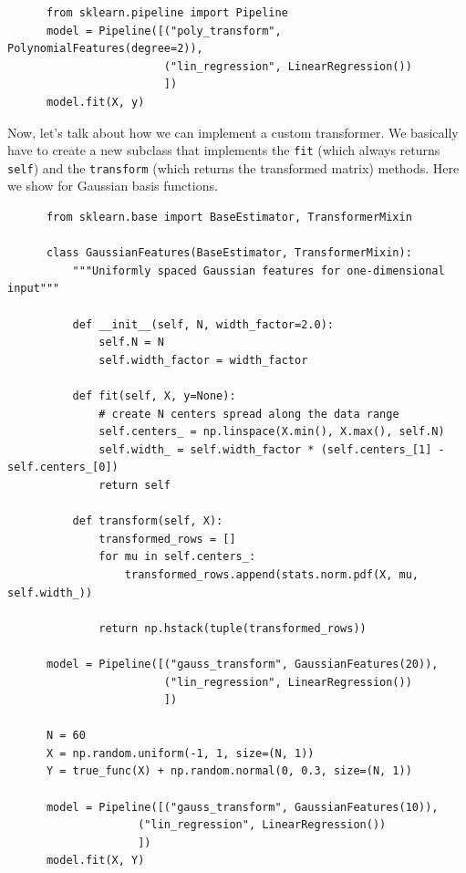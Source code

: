 \documentclass{article}
\begin{document}
      \begin{lstlisting}
      from sklearn.pipeline import Pipeline
      model = Pipeline([("poly_transform", PolynomialFeatures(degree=2)), 
                        ("lin_regression", LinearRegression())
                        ]) 
      model.fit(X, y)
      \end{lstlisting}

      Now, let's talk about how we can implement a custom transformer. We basically have to create a new subclass that implements the \texttt{fit} (which always returns \texttt{self}) and the \texttt{transform} (which returns the transformed matrix) methods. Here we show for Gaussian basis functions. 

      \begin{lstlisting}
      from sklearn.base import BaseEstimator, TransformerMixin

      class GaussianFeatures(BaseEstimator, TransformerMixin):
          """Uniformly spaced Gaussian features for one-dimensional input"""
          
          def __init__(self, N, width_factor=2.0):
              self.N = N
              self.width_factor = width_factor
              
          def fit(self, X, y=None):
              # create N centers spread along the data range
              self.centers_ = np.linspace(X.min(), X.max(), self.N)
              self.width_ = self.width_factor * (self.centers_[1] - self.centers_[0])
              return self
              
          def transform(self, X): 
              transformed_rows = []
              for mu in self.centers_: 
                  transformed_rows.append(stats.norm.pdf(X, mu, self.width_))
              
              return np.hstack(tuple(transformed_rows))

      model = Pipeline([("gauss_transform", GaussianFeatures(20)), 
                        ("lin_regression", LinearRegression())
                        ]) 

      N = 60
      X = np.random.uniform(-1, 1, size=(N, 1)) 
      Y = true_func(X) + np.random.normal(0, 0.3, size=(N, 1)) 

      model = Pipeline([("gauss_transform", GaussianFeatures(10)), 
                    ("lin_regression", LinearRegression())
                    ]) 
      model.fit(X, Y)
      \end{lstlisting} 
\end{document}
